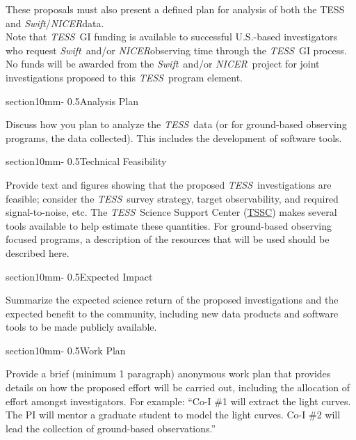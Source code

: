 \documentclass[letterpaper,12pt]{article}
\makeatletter
\renewcommand{\section}{\@startsection%
{section}{1}{0mm}{-\baselineskip}%
{0.5\baselineskip}{\normalfont\Large\bfseries}}%
\newcommand{\tess}{{\it TESS}}
\newcommand{\swift}{{\it Swift}}
\newcommand{\nicer}{{\it NICER}}
\makeatother
\begin{document}
These proposals must also present a defined plan for analysis of both the TESS and \swift/\nicer data.\\

\noindent Note that \tess\ GI funding is available to successful U.S.-based investigators who request \swift\ and/or \nicer  observing time through the \tess\ GI process. No funds will be awarded from the \swift\ and/or \nicer\ project for joint investigations proposed to this \tess\ program element. 

\section{Analysis Plan}

Discuss how you plan to analyze the \tess\ data (or for ground-based observing programs, the data collected). This includes the development of software tools.

\section{Technical Feasibility}

Provide text and figures showing that the proposed \tess\ investigations are feasible; consider the \tess\ survey strategy, target observability, and required signal-to-noise, etc. The \tess\ Science Support Center (\href{https://heasarc.gsfc.nasa.gov/docs/tess/}{TSSC}) makes several tools available to help estimate these quantities. For ground-based observing focused programs, a description of the resources that will be used should be described here.

\section{Expected Impact}

Summarize the expected science return of the proposed investigations and the expected benefit to the community, including new data products and software tools to be made publicly available.

\section{Work Plan}

Provide a brief (minimum 1 paragraph) anonymous work plan that provides details on how the proposed effort will be carried out, including the allocation of effort amongst investigators. For example: ``Co-I \#1 will extract the light curves. The PI will mentor a graduate student to model the light curves. Co-I \#2 will lead the collection of ground-based observations.'' 
\\
\end{document}
